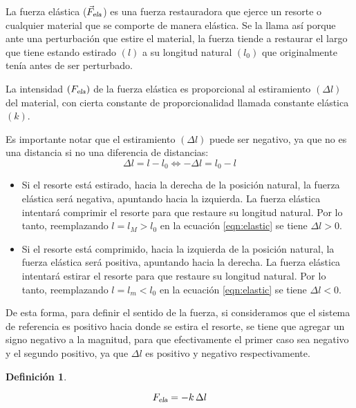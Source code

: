 \documentclass[a5paper,12pt,twoside]{book}
\newtheorem{defn}{{Definición}}[chapter]
\begin{document}
La fuerza elástica (${{\Vec{F}}_\textsl{{ela}}}$) es una fuerza restauradora que ejerce un resorte o cualquier material que se comporte de manera elástica. Se la llama así porque ante una perturbación que estire el material, la fuerza tiende a restaurar el largo que tiene estando estirado $(l)$ a su longitud natural $(l_0)$ que originalmente tenía antes de ser perturbado.

La intensidad $({{F}_\textsl{{ela}}})$ de la fuerza elástica es proporcional al estiramiento $(\Delta l)$ del material, con cierta constante de proporcionalidad llamada constante elástica $(k)$.

\begin{center}
    \def\svgwidth{0.7\linewidth}
    
\end{center}

Es importante notar que el estiramiento $(\Delta l)$ puede ser negativo, ya que no es una distancia si no una diferencia de distancias:
\begin{equation}
    \Delta l = l-l_0 \iff -\Delta l = l_0-l
    \label{eqn:elastic}
\end{equation}

\begin{itemize}
    \item Si el resorte está estirado, hacia la derecha de la posición natural, la fuerza elástica será negativa, apuntando hacia la izquierda. La fuerza elástica intentará comprimir el resorte para que restaure su longitud natural. Por lo tanto, reemplazando $l=l_M>l_0$ en la ecuación \ref{eqn:elastic} se tiene $\Delta l>0$.
    
    \item Si el resorte está comprimido, hacia la izquierda de la posición natural, la fuerza elástica será positiva, apuntando hacia la derecha. La fuerza elástica intentará estirar el resorte para que restaure su longitud natural. Por lo tanto, reemplazando $l=l_m<l_0$ en la ecuación \ref{eqn:elastic} se tiene $\Delta l<0$.
\end{itemize}

De esta forma, para definir el sentido de la fuerza, si consideramos que el sistema de referencia es positivo hacia donde se estira el resorte, se tiene que agregar un signo negativo a la magnitud, para que efectivamente el primer caso sea negativo y el segundo positivo, ya que $\Delta l$ es positivo y negativo respectivamente.

\begin{mdframed}[style=MyFrame1]
    \begin{defn}
        \label{defn:elasticForce}
    \end{defn}
    \begin{equation*}
        {{F}_\textsl{{ela}}} = -k \, \Delta l
    \end{equation*}
\end{mdframed}
\end{document}

